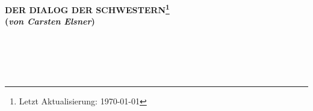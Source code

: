
\begin{center}
\bf DER DIALOG DER SCHWESTERN\footnote{Letzt Aktualisierung: \today}
\[\]
({\em von Carsten Elsner\/})
\end{center}
\[\]

\[\]

\[\] %

\newpage %

\[\] %

\[\]

\[\]


